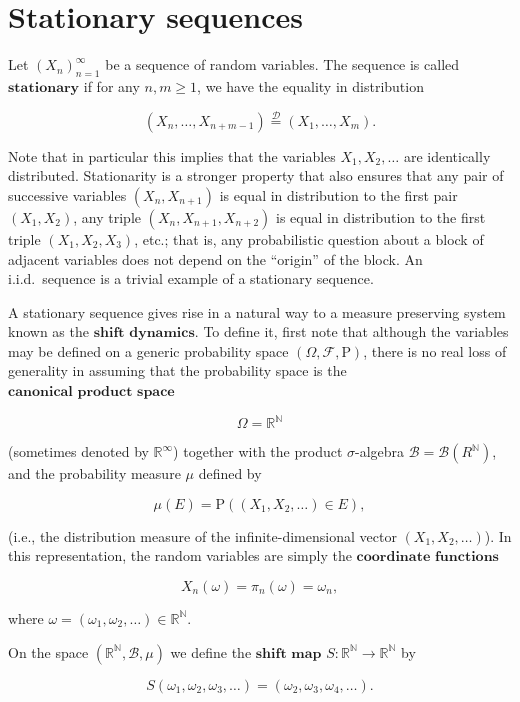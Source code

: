 \documentclass[11pt]{report}
\newcommand{\R}{\mathbb{R}}
\newcommand{\N}{\mathbb{N}}
\theoremstyle{plain}
\theoremstyle{definition}
\begin{document}
\section{Stationary sequences}
\label{sec-stationary}
Let $(X_n)_{n=1}^\infty$ be a sequence of random variables. The sequence is called $\textbf{stationary}$ if for any $n,m\ge 1$, we have the equality in distribution

\begin{equation*} \tag{14}\label{eq:def-stationary}
(X_n,\ldots,X_{n+m-1}) \stackrel{\mathcal{D}}{=} (X_1,\ldots,X_m).
\end{equation*}

Note that in particular this implies that the variables $X_1,X_2,\ldots$ are identically distributed. Stationarity is a stronger property that also ensures that any pair of successive variables $(X_n,X_{n+1})$ is equal in distribution to the first pair $(X_1,X_2)$, any triple $(X_n,X_{n+1},X_{n+2})$ is equal in distribution to the first triple $(X_1,X_2,X_3)$, etc.; that is, any probabilistic question about a block of adjacent variables does not depend on the ``origin'' of the block. An i.i.d.\ sequence is a trivial example of a stationary sequence.

A stationary sequence gives rise in a natural way to a measure preserving system known as the $\textbf{shift dynamics}$. To define it, first note that although the variables may be defined on a generic probability space $(\Omega, \mathcal{F},\mathrm{P})$, there is no real loss of generality in assuming that the probability space is the $\textbf{canonical product space}$

\[
\Omega = \R^\N
\]

(sometimes denoted by $\R^\infty$) together with the product $\sigma$-algebra $\mathcal{B}=\mathcal{B}(R^\N)$, and the probability measure $\mu$ defined by

\[
\mu(E) = \mathrm{P}( (X_1,X_2,\ldots) \in E ),
\]

(i.e., the distribution measure of the infinite-dimensional vector $(X_1,X_2,\ldots)$). In this representation, the random variables are simply the $\textbf{coordinate functions}$

\[
X_n(\omega) = \pi_n(\omega) = \omega_n,
\]

where $\omega=(\omega_1, \omega_2, \ldots) \in \R^\N$.

On the space $(\R^\N,\mathcal{B}, \mu)$ we define the $\textbf{shift map}$ $S:\R^\N\to\R^\N$ by

\[
S(\omega_1,\omega_2, \omega_3, \ldots) = (\omega_2,\omega_3,\omega_4, \ldots).
\]
\end{document}
